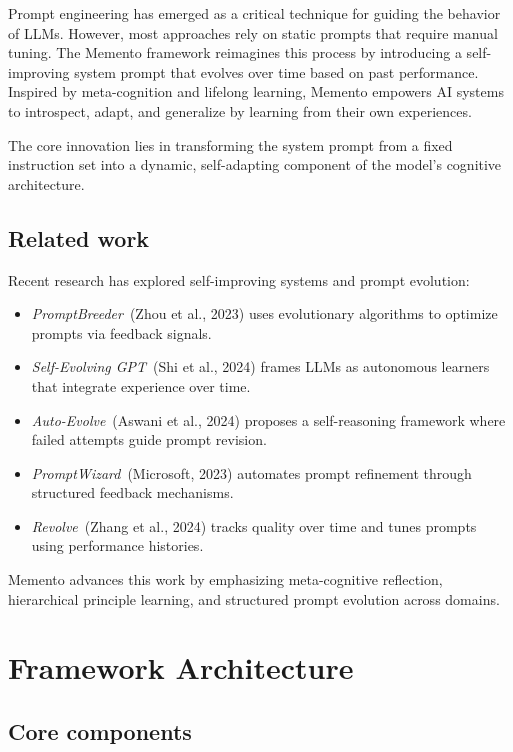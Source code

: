 \documentclass[10pt,a4paper,twocolumn]{article}
\begin{document}
Prompt engineering has emerged as a critical technique for guiding the behavior of LLMs. However, most approaches rely on static prompts that require manual tuning. The Memento framework reimagines this process by introducing a self-improving system prompt that evolves over time based on past performance. Inspired by meta-cognition and lifelong learning, Memento empowers AI systems to introspect, adapt, and generalize by learning from their own experiences.

The core innovation lies in transforming the system prompt from a fixed instruction set into a dynamic, self-adapting component of the model’s cognitive architecture.



\subsection{Related work}

Recent research has explored self-improving systems and prompt evolution:

\begin{itemize}
    \item \textit{PromptBreeder} (Zhou et al., 2023) uses evolutionary algorithms to optimize prompts via feedback signals.
    \item \textit{Self-Evolving GPT} (Shi et al., 2024) frames LLMs as autonomous learners that integrate experience over time.
    \item \textit{Auto-Evolve} (Aswani et al., 2024) proposes a self-reasoning framework where failed attempts guide prompt revision.
    \item \textit{PromptWizard} (Microsoft, 2023) automates prompt refinement through structured feedback mechanisms.
    \item \textit{Revolve} (Zhang et al., 2024) tracks quality over time and tunes prompts using performance histories.
\end{itemize}
Memento advances this work by emphasizing meta-cognitive reflection, hierarchical principle learning, and structured prompt evolution across domains.


\section{{Framework Architecture} }



\subsection{Core components}
\end{document}
